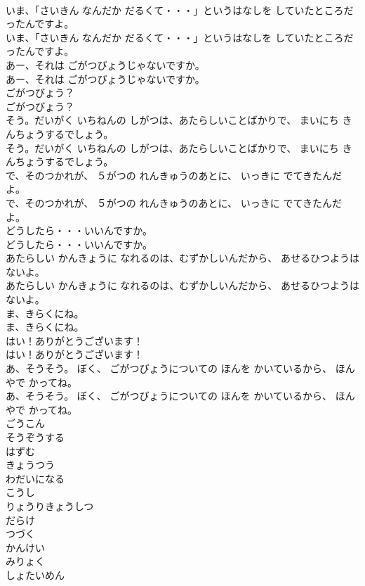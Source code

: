 \documentclass[8pt]{extreport}
\begin{document}
\begin{CJK}{UTF8}{min}
\\	いま、「さいきん なんだか だるくて・・・」というはなしを していたところだったんですよ。
\\	いま、「さいきん なんだか だるくて・・・」というはなしを していたところだったんですよ。
\\	あー、それは ごがつびょうじゃないですか。
\\	あー、それは ごがつびょうじゃないですか。
\\	ごがつびょう？
\\	ごがつびょう？
\\	そう。だいがく いちねんの しがつは、あたらしいことばかりで、 まいにち きんちょうするでしょう。
\\	そう。だいがく いちねんの しがつは、あたらしいことばかりで、 まいにち きんちょうするでしょう。
\\	で、そのつかれが、 ５がつの れんきゅうのあとに、 いっきに でてきたんだよ。
\\	で、そのつかれが、 ５がつの れんきゅうのあとに、 いっきに でてきたんだよ。
\\	どうしたら・・・いいんですか。
\\	どうしたら・・・いいんですか。
\\	あたらしい かんきょうに なれるのは、むずかしいんだから、 あせるひつようは ないよ。
\\	あたらしい かんきょうに なれるのは、むずかしいんだから、 あせるひつようは ないよ。
\\	ま、きらくにね。
\\	ま、きらくにね。
\\	はい！ありがとうございます！
\\	はい！ありがとうございます！
\\	あ、そうそう。 ぼく、 ごがつびょうについての ほんを かいているから、 ほんやで かってね。
\\	あ、そうそう。 ぼく、 ごがつびょうについての ほんを かいているから、 ほんやで かってね。
\\	ごうこん
\\	そうぞうする
\\	はずむ
\\	きょうつう
\\	わだいになる
\\	こうし
\\	りょうりきょうしつ
\\	だらけ
\\	つづく
\\	かんけい
\\	みりょく
\\	しょたいめん

\end{CJK}
\end{document}
